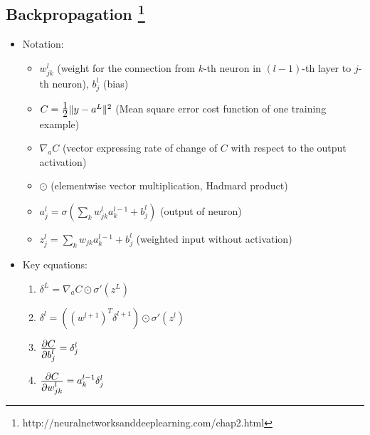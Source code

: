 \subsection*{Backpropagation \footnote{http://neuralnetworksanddeeplearning.com/chap2.html}}
\begin{itemize}
    \item
        Notation:
        \begin{itemize}
            \item
                $w_{jk}^l$ (weight for the connection from $k$-th neuron in $(l-1)$-th layer to $j$-th neuron), $b_j^l$ (bias)
            \item
                $C = \frac{\displaystyle 1}{\displaystyle 2} \lVert y-a^L\rVert^2$ (Mean square error cost function of one training example)
            \item
                $\nabla_a C$ (vector expressing rate of change of $C$ with respect to the output activation)
            \item
                $\odot$ (elementwise vector multiplication, Hadmard product)
            \item
                $a_j^l = \sigma(\sum_k w_{jk}^l a_k^{l-1} + b_j^l)$ (output of neuron)
            \item
                $z_j^l = \sum_k w_{jk} a_k^{l-1} + b_j^l$ (weighted input without activation)
        \end{itemize}

    \item
        Key equations:
        \begin{enumerate}
            \item
                $\delta^L = \nabla_a C \odot \sigma'(z^L)$
            \item
                $\delta^l = ((w^{l+1})^T \delta^{l+1})\odot \sigma'(z^l)$
            \item
                $\frac{\displaystyle \partial C}{\displaystyle \partial b_j^l} = \delta_j^l$
            \item
                $\frac{\displaystyle \partial C}{\displaystyle \partial w_{jk}^l} = a_k^{l-1} \delta_j^l$
        \end{enumerate}


\end{itemize}
